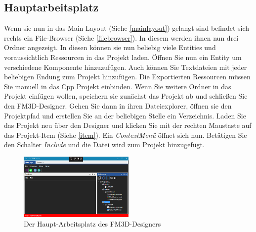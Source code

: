 \subsection{Hauptarbeitsplatz}
Wenn sie nun in das Main-Layout (Siehe \cref{mainlayout}) gelangt sind befindet sich rechts ein File-Browser (Siehe \cref{filebrowser}). In diesem werden ihnen nun drei Ordner angezeigt. In diesen können sie nun beliebig viele Entities und voraussichtlich Ressourcen in das Projekt laden. Öffnen Sie nun ein Entity um verschiedene Komponente hinzuzufügen.
Auch können Sie Textdateien mit jeder beliebigen Endung zum Projekt hinzufügen.
Die Exportierten Ressourcen müssen Sie manuell in das Cpp Projekt einbinden.
Wenn Sie weitere Ordner in das Projekt einfügen wollen, speichern sie zunächst das Projekt ab und schließen Sie den FM3D-Designer. Gehen Sie dann in ihren Dateiexplorer, öffnen sie den Projektpfad und erstellen Sie an der beliebigen Stelle ein Verzeichnis. Laden Sie das Projekt neu über den Designer und klicken Sie mit der rechten Maustaste auf das Projekt-Item (Siehe \cref{item}). Ein \textit{ContextMenü} öffnet sich nun. Betätigen Sie den Schalter \textit{Include} und die Datei wird zum Projekt hinzugefügt.
\begin{figure}
	\begin{center}
		\includegraphics[width=0.5\textwidth]{04verwendung/Designer/01workstation.PNG}
		\caption{Der Haupt-Arbeitsplatz des FM3D-Designers}\label{arbeitsplatz}
	\end{center}
\end{figure}

